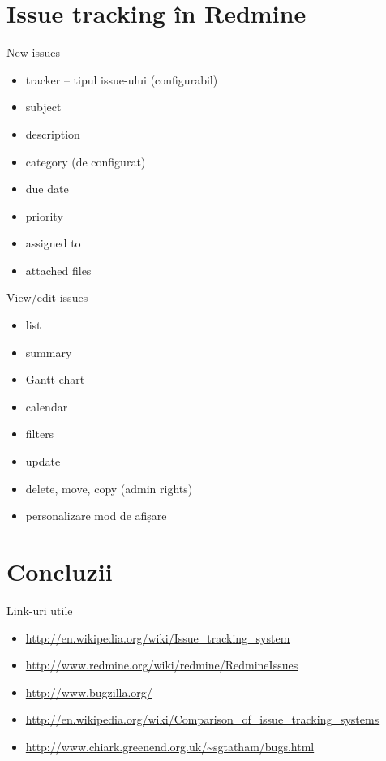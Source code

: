 \documentclass{beamer}
\begin{document}
\section{Issue tracking în Redmine}

\frame{\tableofcontents[currentsection]}

\begin{frame}{New issues}
  \begin{itemize}
    \item tracker -- tipul issue-ului (configurabil)
    \item subject
    \item description
    \item category (de configurat)
    \item due date
    \item priority
    \item assigned to
    \item attached files
  \end{itemize}
\end{frame}

\begin{frame}{View/edit issues}
  \begin{itemize}
    \item list
    \item summary
    \item Gantt chart
    \item calendar
    \item filters
    \item update
    \item delete, move, copy (admin rights)
    \item personalizare mod de afișare
  \end{itemize}
\end{frame}

\section{Concluzii}

\frame{\tableofcontents[currentsection]}

\begin{frame}{Link-uri utile}
  \begin{itemize}
    \item \url{http://en.wikipedia.org/wiki/Issue\_tracking\_system}
    \item \url{http://www.redmine.org/wiki/redmine/RedmineIssues}
    \item \url{http://www.bugzilla.org/}
    \item
\url{http://en.wikipedia.org/wiki/Comparison\_of\_issue\_tracking\_systems}
    \item \url{http://www.chiark.greenend.org.uk/~sgtatham/bugs.html}
  \end{itemize}
\end{frame}
\end{document}
